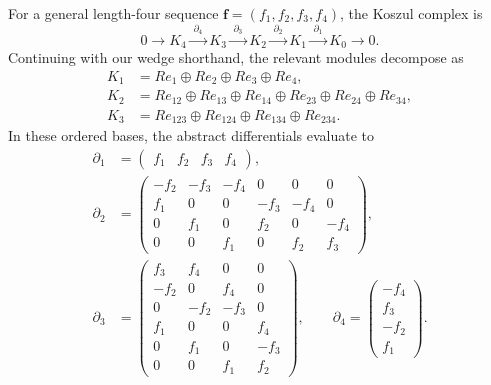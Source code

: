 \documentclass[aps,prx,english,superscriptaddress,twocolumn,tightenlines,showpacs,longbibliography,floatfix,amsfonts]{revtex4-2}
\theoremstyle{remark}
\theoremstyle{definition}
\begin{document}
For a general length-four sequence $\mathbf{f}=(f_1, f_2, f_3, f_4)$, the Koszul complex is
\begin{equation}
	0 \longrightarrow K_4 \xrightarrow{\;\partial_4\;} K_3 \xrightarrow{\;\partial_3\;} K_2 \xrightarrow{\;\partial_2\;} K_1 \xrightarrow{\;\partial_1\;} K_0 \longrightarrow 0.
	\label{eq:4d-toric-koszul}
\end{equation}
Continuing with our wedge shorthand, the relevant modules decompose as
\begin{equation}
	\begin{aligned}
		K_1 &= R e_1\oplus R e_2\oplus R e_3\oplus R e_4,\\
		K_2 &= R e_{12}\oplus R e_{13}\oplus R e_{14} \oplus R e_{23}\oplus R e_{24}\oplus R e_{34},\\
		K_3 &= R e_{123}\oplus R e_{124}\oplus R e_{134}\oplus R e_{234}.
	\end{aligned}
\end{equation}
In these ordered bases, the abstract differentials evaluate to
\begin{subequations}
	\label{eq:4d-differentials}
	\begin{align}
		\partial_1 &= \begin{pmatrix} f_1 & f_2 & f_3 & f_4 \end{pmatrix}, \\[1ex]
		\partial_2 &= \begin{pmatrix}
			-f_2 & -f_3 & -f_4 & 0    & 0    & 0\\
			f_1  & 0    & 0    & -f_3 & -f_4 & 0\\
			0    & f_1  & 0    & f_2  & 0    & -f_4\\
			0    & 0    & f_1  & 0    & f_2  & f_3
		\end{pmatrix}, \\[1ex]
		\partial_3 &= \begin{pmatrix}
			f_3  & f_4  & 0    & 0\\
			-f_2 & 0    & f_4  & 0\\
			0    & -f_2 & -f_3 & 0\\
			f_1  & 0    & 0    & f_4\\
			0    & f_1  & 0    & -f_3\\
			0    & 0    & f_1  & f_2
		\end{pmatrix}, \qquad
		\partial_4 = \begin{pmatrix}
			-f_4\\ f_3\\ -f_2\\ f_1
		\end{pmatrix}.
	\end{align} \label{eq:KC4}
\end{subequations}
\end{document}
